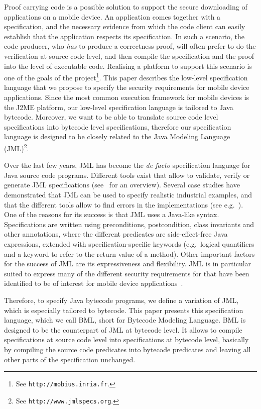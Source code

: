 Proof carrying code is a possible solution to support the secure
downloading of applications on a mobile device. An application comes
together with a specification, and the necessary evidence from which
the code client can easily establish that the application respects its
specification. In such a scenario, the code producer, who \emph{has}
to produce a correctness proof, will often prefer to do the
verification at source code level, and then compile the specification
and the proof into the level of executable code. Realising a platform
to support this scenario is one of the goals of the \mobius
project\footnote{See
\texttt{http://mobius.inria.fr}.}. This paper describes the
low-level specification language that we propose to specify the
security requirements for mobile device applications. Since the most
common execution framework for mobile devices is the J2ME platform,
our low-level specification language is tailored to Java
bytecode. Moreover, we want to be able to translate source code level
specifications into bytecode level specifications, therefore our
specification language is designed to be closely related to the Java
Modeling Language (JML)\footnote{See
\texttt{http://www.jmlspecs.org}.}.


Over the last few years, JML has become the \emph{de facto}
specification language for Java source code programs. Different tools
exist that allow to validate, verify or generate JML specifications
(see~\cite{BurdyCCEKLLP05} for an overview). Several case studies have
demonstrated that JML can be used to specify realistic industrial
examples, and that the different tools allow to find errors in the
implementations (see e.g.~\cite{BreunesseCHJ04}). One of the reasons
for its success is that JML uses a Java-like syntax. Specifications
are written using preconditions, postcondition, class invariants and
other annotations, where the different predicates are side-effect-free
Java expressions, extended with specification-specific keywords
(e.g.~logical quantifiers and a keyword to refer to the return value
of a method). Other important factors for the success of JML are its
expressiveness and flexibility. JML is in particular suited to express
many of the different security requirements for that have been
identified to be of interest for mobile device
applications~\cite{Deliverable1.2?}.


Therefore, to specify Java bytecode programs, we define a variation
of JML, which is especially tailored to bytecode. This paper
presents this specification language, which we call BML, short for
Bytecode Modeling Language. BML is designed to be the counterpart of
JML at bytecode level. It allows to compile specifications at source
code level into specifications at bytecode level, basically by
compiling the source code predicates into bytecode predicates and
leaving all other parts of the specification unchanged.

